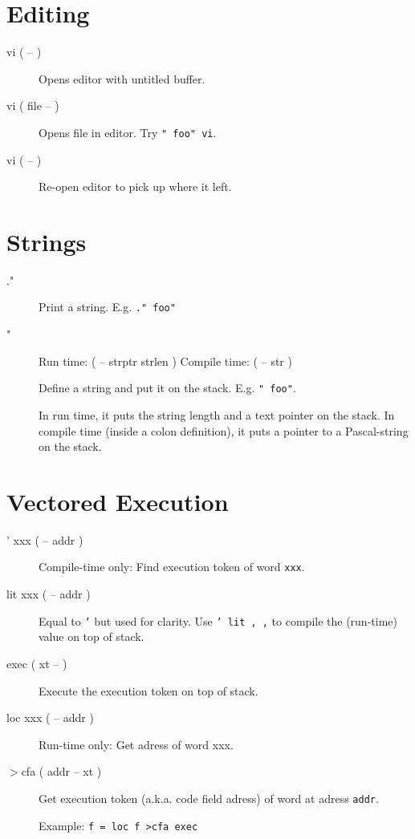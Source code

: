 \section{Editing}

\begin{description}
\item[vi ( -- )]

Opens editor with untitled buffer.
\end{description}

\begin{description}
\item[vi ( file -- )]

Opens file in editor. Try \texttt{" foo" vi}.

\item[vi ( -- )]

Re-open editor to pick up where it left.

\end{description}

\section{Strings}

\begin{description}
\item[."]

Print a string. E.g. \texttt{." foo"}

\item["] Run time: ( -- strptr strlen ) Compile time: ( -- str )

Define a string and put it on the stack. E.g. \texttt{" foo"}. 

In run time, it puts the string length and a text pointer on the stack. In compile time (inside a colon definition), it puts a pointer to a Pascal-string on the stack.

\end{description}


\section{Vectored Execution}

\begin{description}
\item[' xxx ( -- addr )] Compile-time only: Find execution token of word \texttt{xxx}.
\item[lit xxx ( -- addr )] Equal to \texttt{'} but used for clarity. Use \texttt{' lit , ,} to compile the (run-time) value on top of stack.
\item[exec ( xt -- )] Execute the execution token on top of stack.
\item[loc xxx ( -- addr )] Run-time only: Get adress of word xxx.
\item[$>$cfa ( addr -- xt )] Get execution token (a.k.a. code field adress) of word at adress \texttt{addr}.

Example: \texttt{f = loc f >cfa exec}
\end{description}


